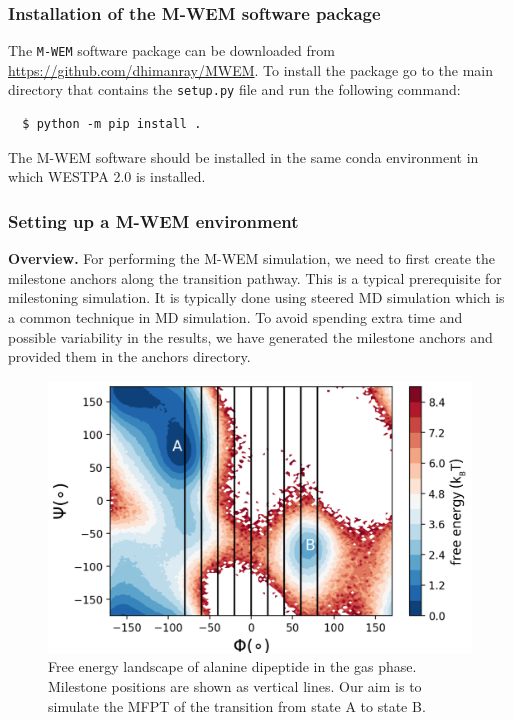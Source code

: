\subsubsection{Installation of the M-WEM software package}

The \verb|M-WEM| software package can be downloaded from {\url{https://github.com/dhimanray/MWEM}}. 
To install the package go to the main directory that contains the \verb|setup.py| file and run the following command:

\begin{verbatim}
  $ python -m pip install .
\end{verbatim}

The M-WEM software should be installed in the same conda environment in which WESTPA 2.0 is installed.

\subsubsection{Setting up a M-WEM environment}

\textbf{Overview.} For performing the M-WEM simulation, we need to first create the milestone anchors along the transition pathway. 
This is a typical prerequisite for milestoning simulation. 
It is typically done using steered MD simulation \citep{griebel_steered_1999} which is a common technique in MD simulation. 
To avoid spending extra time and possible variability in the results, we have generated the milestone anchors and provided them in the anchors directory.

\begin{figure}[t]
\centering
\includegraphics[width=\columnwidth]{figures/Figure9_RBin.pdf}
\caption{Free energy landscape of alanine dipeptide in the gas phase. Milestone positions are shown as vertical lines. 
Our aim is to simulate the MFPT of the transition from state A to state B.}
\end{figure}

